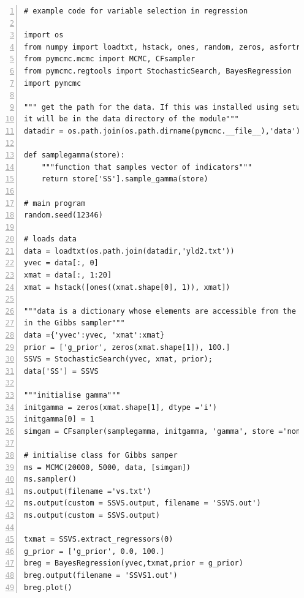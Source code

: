 \documentclass[article]{jss}
\begin{document}
\begin{lstlisting}[basicstyle={\scriptsize},numbers=left]
# example code for variable selection in regression

import os
from numpy import loadtxt, hstack, ones, random, zeros, asfortranarray, log
from pymcmc.mcmc import MCMC, CFsampler
from pymcmc.regtools import StochasticSearch, BayesRegression
import pymcmc

""" get the path for the data. If this was installed using setup.py
it will be in the data directory of the module"""
datadir = os.path.join(os.path.dirname(pymcmc.__file__),'data')

def samplegamma(store):
    """function that samples vector of indicators"""
    return store['SS'].sample_gamma(store)

# main program
random.seed(12346)

# loads data
data = loadtxt(os.path.join(datadir,'yld2.txt'))
yvec = data[:, 0]
xmat = data[:, 1:20]
xmat = hstack([ones((xmat.shape[0], 1)), xmat])

"""data is a dictionary whose elements are accessible from the functions
in the Gibbs sampler"""
data ={'yvec':yvec, 'xmat':xmat}
prior = ['g_prior', zeros(xmat.shape[1]), 100.]
SSVS = StochasticSearch(yvec, xmat, prior);
data['SS'] = SSVS

"""initialise gamma"""
initgamma = zeros(xmat.shape[1], dtype ='i')
initgamma[0] = 1
simgam = CFsampler(samplegamma, initgamma, 'gamma', store ='none')

# initialise class for Gibbs samper
ms = MCMC(20000, 5000, data, [simgam])
ms.sampler()
ms.output(filename ='vs.txt')
ms.output(custom = SSVS.output, filename = 'SSVS.out')
ms.output(custom = SSVS.output)

txmat = SSVS.extract_regressors(0)
g_prior = ['g_prior', 0.0, 100.]
breg = BayesRegression(yvec,txmat,prior = g_prior)
breg.output(filename = 'SSVS1.out')
breg.plot()
\end{lstlisting}
\end{document}
